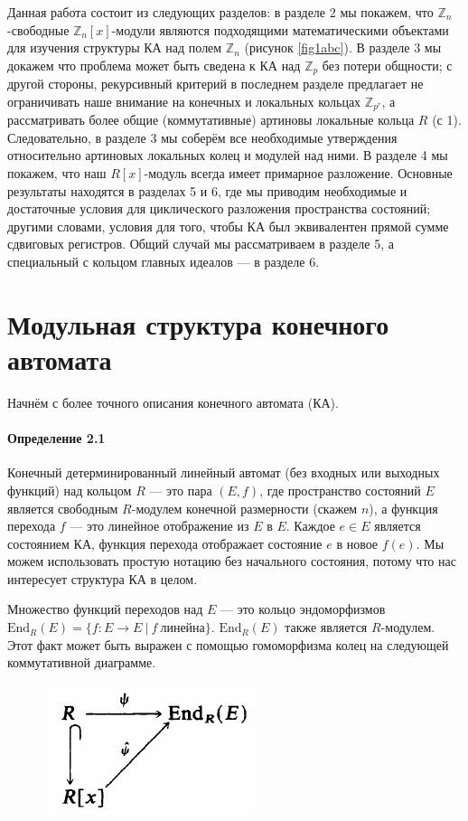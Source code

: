\documentclass[a4paper,12pt]{article}
\newcommand{\Endom}{\text{End}}
\begin{document}
Данная работа состоит из следующих разделов: в разделе 2 мы покажем, что $\mathbb{Z}_{n}$-свободные $\mathbb{Z}_{n}[x]$-модули являются подходящими математическими объектами для изучения структуры КА над полем $\mathbb{Z}_{n}$ (рисунок \ref{fig1abc}). В разделе 3 мы докажем что проблема может быть сведена к КА над $\mathbb{Z}_{p}$ без потери общности; с другой стороны, рекурсивный критерий в последнем разделе предлагает не ограничивать наше внимание на конечных и локальных кольцах $\mathbb{Z}_{p^r}$, а рассматривать более общие (коммутативные) артиновы локальные кольца $R$ (с 1). Следовательно, в разделе 3 мы соберём все необходимые утверждения относительно артиновых локальных колец и модулей над ними. В разделе 4 мы покажем, что наш $R[x]$-модуль всегда имеет примарное разложение. Основные результаты находятся в разделах 5 и 6, где мы приводим необходимые и достаточные условия для циклического разложения пространства состояний; другими словами, условия для того, чтобы КА был эквивалентен прямой сумме сдвиговых регистров. Общий случай мы рассматриваем в разделе 5, а специальный с кольцом главных идеалов --- в разделе 6.


\section{Модульная структура конечного автомата}

Начнём с более точного описания конечного автомата (КА).

\paragraph{Определение 2.1}

Конечный детерминированный линейный автомат (без входных или выходных функций) над кольцом $R$ --- это пара $(E,f)$, где пространство состояний $E$ является свободным $R$-модулем конечной размерности (скажем $n$), а функция перехода $f$ --- это линейное отображение из $E$ в $E$. Каждое $e \in E$ является состоянием КА, функция перехода отображает состояние $e$ в новое $f(e)$. Мы можем использовать простую нотацию без начального состояния, потому что нас интересует структура КА в целом.

Множество функций переходов над $E$ --- это кольцо эндоморфизмов $\Endom_R(E) = \{f : E \rightarrow E ~| ~f~ линейна\}$. $\Endom_R(E)$ также является $R$-модулем. Этот факт может быть выражен с помощью гомоморфизма колец на следующей коммутативной диаграмме.

\begin{figure}[h]
	\centering
	\includegraphics[width=0.25\linewidth]{pictures/diag_1.png}
\end{figure}
\end{document}

